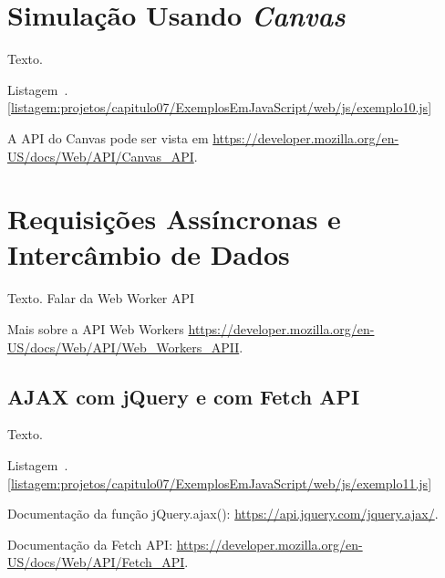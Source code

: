 \section{Simulação Usando \textit{Canvas}}

Texto.

Listagem~\thechapter.\ref{listagem:projetos/capitulo07/ExemplosEmJavaScript/web/js/exemplo10.js}


\begin{saibaMais}
    A API do Canvas pode ser vista em \url{https://developer.mozilla.org/en-US/docs/Web/API/Canvas_API}.
\end{saibaMais}



\section{Requisições Assíncronas e Intercâmbio de Dados}

Texto. Falar da Web Worker API

\begin{saibaMais}
    Mais sobre a API Web Workers \url{https://developer.mozilla.org/en-US/docs/Web/API/Web_Workers_APII}.
\end{saibaMais}


\subsection{AJAX com jQuery e com Fetch API}

Texto.

Listagem~\thechapter.\ref{listagem:projetos/capitulo07/ExemplosEmJavaScript/web/js/exemplo11.js}


\begin{saibaMais}
    Documentação da função jQuery.ajax(): \url{https://api.jquery.com/jquery.ajax/}.
\end{saibaMais}

\begin{saibaMais}
    Documentação da Fetch API: \url{https://developer.mozilla.org/en-US/docs/Web/API/Fetch_API}.
\end{saibaMais}


